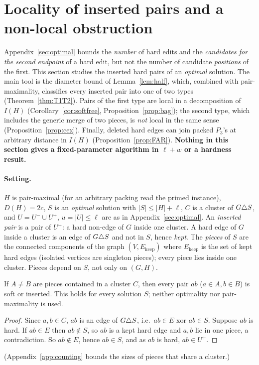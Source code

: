 \section{Locality of inserted pairs and a non-local obstruction}\label{sec:locality}
Appendix~\ref{sec:optimal} bounds the \emph{number} of hard edits and the \emph{candidates for the second endpoint} of a hard edit, but not the number of candidate \emph{positions} of the first. This section studies the inserted hard pairs of an \emph{optimal} solution. The main tool is the diameter bound of Lemma~\ref{lem:half}, which, combined with pair-maximality, classifies every inserted pair into one of two types (Theorem~\ref{thm:T1T2}). Pairs of the first type are local in a decomposition of $I(H)$ (Corollary~\ref{cor:softfree}, Proposition~\ref{prop:bag}); the second type, which includes the generic merge of two pieces, is \emph{not} local in the same sense (Proposition~\ref{prop:cex}). Finally, deleted hard edges can join packed $P_3$'s at arbitrary distance in $I(H)$ (Proposition~\ref{prop:FAR}). \textbf{Nothing in this section gives a fixed-parameter algorithm in $\ell+w$ or a hardness result.}

\paragraph{Setting.}
$H$ is pair-maximal (for an arbitrary packing read the primed instance), $D(H)=2c$, $S$ is an \emph{optimal} solution with $|S|\le|H|+\ell$, $C$ is a cluster of $G\triangle S$, and $U=U^-\cup U^+$, $u=|U|\le\ell$ are as in Appendix~\ref{sec:optimal}. An \emph{inserted pair} is a pair of $U^+$: a hard non-edge of $G$ inside one cluster. A hard edge of $G$ inside a cluster is an edge of $G\triangle S$ and not in $S$, hence \emph{kept}. The \emph{pieces} of $S$ are the connected components of the graph $(V,E_{\mathrm{keep}})$ where $E_{\mathrm{keep}}$ is the set of kept hard edges (isolated vertices are singleton pieces); every piece lies inside one cluster. Pieces depend on $S$, not only on $(G,H)$.
\begin{lemma}\label{lem:cross}
If $A\ne B$ are pieces contained in a cluster $C$, then every pair $ab$ ($a\in A,b\in B$) is soft or inserted. This holds for every solution $S$; neither optimality nor pair-maximality is used.
\end{lemma}
\begin{proof}
Since $a,b\in C$, $ab$ is an edge of $G\triangle S$, i.e.\ $ab\in E$ xor $ab\in S$. Suppose $ab$ is hard. If $ab\in E$ then $ab\notin S$, so $ab$ is a kept hard edge and $a,b$ lie in one piece, a contradiction. So $ab\notin E$, hence $ab\in S$, and as $ab$ is hard, $ab\in U^+$.
\end{proof}
(Appendix~\ref{app:counting} bounds the sizes of pieces that share a cluster.)

